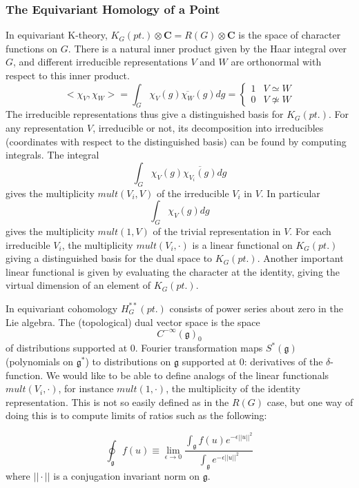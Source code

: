 \documentclass[a4paper,a4paper]{article}
\theoremstyle{conjecture}
\begin{document}
\subsubsection{The Equivariant Homology of a Point}

In equivariant K-theory,
$K_G(pt.)\otimes {\mathbf C}=R(G)\otimes {\mathbf C}$ is the space of 
character functions on $G$.  There is a natural inner product given by
the Haar integral over $G$, and different irreducible representations $V$ and $W$ are
orthonormal with respect to this inner product. 
\begin{equation*}
<\chi_V,\chi_W>=\int_G \chi_V(g)\overline{\chi_W}(g)dg=
\begin{cases}
1&V\simeq W\\
0&V\not\simeq W
\end{cases}
\end{equation*}
The irreducible representations thus give a distinguished basis for $K_G(pt.)$.
For any representation $V$, irreducible or not, its decomposition into
irreducibles (coordinates with respect to the distinguished basis) 
can be found by computing integrals.  The integral
$$\int_G\chi_V(g)\overline{\chi_{V_i}(g)}dg$$
gives the multiplicity $mult(V_i,V)$ of the irreducible $V_i$ in $V$. In particular
$$\int_G\chi_V(g)dg$$
gives the multiplicity $mult(1, V)$ of the trivial representation in $V$.  For each
irreducible $V_i$, the multiplicity $mult(V_i,\cdot)$ is a linear functional
on $K_G(pt.)$ giving a distinguished basis for the dual space to $K_G(pt.)$.  
Another important linear functional is given by evaluating the character
at the identity, giving the virtual dimension of an element of $K_G(pt.)$.

In equivariant cohomology $H^{**}_G(pt.)$ consists of power series about
zero in the Lie algebra. The (topological) dual vector space is the space
$$C^{-\infty}(\mathfrak g)_0$$
of distributions supported at $0$.  Fourier transformation maps $S^*(\mathfrak g)$ 
(polynomials on ${\mathfrak g}^*$) to distributions on $\mathfrak g$ supported at $0$: derivatives
of the $\delta$-function.  We would like to be able to define analogs of the
linear functionals $mult(V_i,\cdot)$, for instance $mult(1,\cdot)$, the multiplicity of the
identity representation.  This is not so easily defined as in the $R(G)$ case, but
one way of doing this is to compute limits of ratios such as the following:

$$\oint_{\mathfrak g} f(u)\equiv\lim_{\epsilon\rightarrow 0} \frac{\int_{\mathfrak g} f(u) e^{-\epsilon ||u||^2}} 
{\int_{\mathfrak g}e^{-\epsilon ||u||^2}}$$
where $||\cdot||$ is a conjugation invariant norm on $\mathfrak g$.
\end{document}
